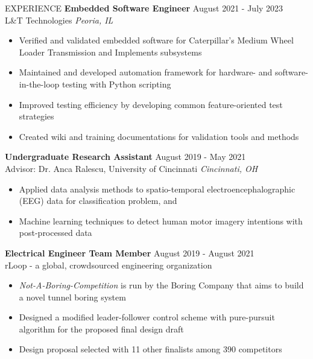 \documentclass{lib/resume} %
\begin{document}
\begin{rSection}{EXPERIENCE}
    \textbf{Embedded Software Engineer} \hfill August 2021 - July 2023 \\
    L\&T Technologies \hfill \textit{Peoria, IL}
    \begin{itemize}
        \itemsep -4pt {}
            \item Verified and validated embedded software for Caterpillar's Medium Wheel Loader Transmission and Implements subsystems
            \item Maintained and developed automation framework for hardware- and software-in-the-loop testing with Python scripting
            \item Improved testing efficiency by developing common feature-oriented test strategies
            \item Created wiki and training documentations for validation tools and methods
    \end{itemize}

    \textbf{Undergraduate Research Assistant} \hfill August 2019 - May 2021 \\
    Advisor: Dr. Anca Ralescu, University of Cincinnati \hfill \textit{Cincinnati, OH}
    \begin{itemize}
        \itemsep -4pt {}
        \item Applied data analysis methods to spatio-temporal electroencephalographic (EEG) data for classification problem, and
        \item Machine learning techniques to detect human motor imagery intentions with post-processed data
    \end{itemize}



    \textbf{Electrical Engineer Team Member} \hfill August 2019 - August 2021
    \\	rLoop - a global, crowdsourced engineering organization \hfill \textit{}
    \begin{itemize}
        \itemsep -4pt {}
        \item \textit{Not-A-Boring-Competition} is run by the Boring Company that aims to build a novel tunnel boring system
        \item Designed a modified leader-follower control scheme with pure-pursuit algorithm for the proposed final design draft
        \item Design proposal selected with 11 other finalists among 390 competitors
    \end{itemize}
\end{rSection}
\end{document}
